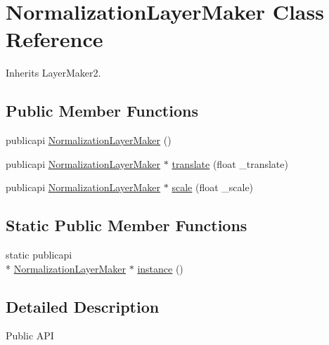 \hypertarget{classNormalizationLayerMaker}{\section{Normalization\-Layer\-Maker Class Reference}
\label{classNormalizationLayerMaker}
}


Inherits Layer\-Maker2.

\subsection*{Public Member Functions}
\begin{DoxyCompactItemize}
\item 
publicapi \hyperlink{classNormalizationLayerMaker_a763386829f0431cccb5d5eedec5876f6}{Normalization\-Layer\-Maker} ()
\item 
publicapi \hyperlink{classNormalizationLayerMaker}{Normalization\-Layer\-Maker} $\ast$ \hyperlink{classNormalizationLayerMaker_a066b06f1db1da8c261e16c72839a9ad5}{translate} (float \-\_\-translate)
\item 
publicapi \hyperlink{classNormalizationLayerMaker}{Normalization\-Layer\-Maker} $\ast$ \hyperlink{classNormalizationLayerMaker_a9340f7041aa367dbfa3ef5ebf3bbb100}{scale} (float \-\_\-scale)
\end{DoxyCompactItemize}
\subsection*{Static Public Member Functions}
\begin{DoxyCompactItemize}
\item 
static publicapi \\*
\hyperlink{classNormalizationLayerMaker}{Normalization\-Layer\-Maker} $\ast$ \hyperlink{classNormalizationLayerMaker_a2111256b400f82bdeebade32e23da5c0}{instance} ()
\end{DoxyCompactItemize}


\subsection{Detailed Description}
\begin{DoxyParagraph}{Public A\-P\-I}

\end{DoxyParagraph}


